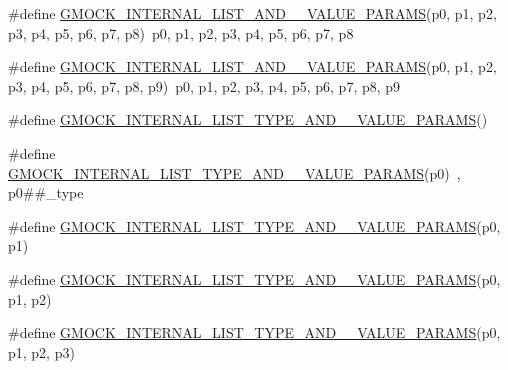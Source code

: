 \begin{DoxyCompactItemize}
\item 
\#define \mbox{\hyperlink{_obj__test_2lib_2googletest-master_2googlemock_2include_2gmock_2gmock-generated-actions_8h_a3e91ec053856b1b3c011b71810fb0992}{G\+M\+O\+C\+K\+\_\+\+I\+N\+T\+E\+R\+N\+A\+L\+\_\+\+L\+I\+S\+T\+\_\+\+A\+N\+D\+\_\+\_\+\+V\+A\+L\+U\+E\+\_\+\+P\+A\+R\+A\+MS}}(p0,  p1,  p2,  p3,  p4,  p5,  p6,  p7,  p8)~p0, p1, p2, p3, p4, p5, p6, p7, p8
\item 
\#define \mbox{\hyperlink{_obj__test_2lib_2googletest-master_2googlemock_2include_2gmock_2gmock-generated-actions_8h_a4dbbb45245e68e2f0eaf65d273c8822c}{G\+M\+O\+C\+K\+\_\+\+I\+N\+T\+E\+R\+N\+A\+L\+\_\+\+L\+I\+S\+T\+\_\+\+A\+N\+D\+\_\+\_\+\+V\+A\+L\+U\+E\+\_\+\+P\+A\+R\+A\+MS}}(p0,  p1,  p2,  p3,  p4,  p5,  p6,  p7,  p8,  p9)~p0, p1, p2, p3, p4, p5, p6, p7, p8, p9
\item 
\#define \mbox{\hyperlink{_obj__test_2lib_2googletest-master_2googlemock_2include_2gmock_2gmock-generated-actions_8h_a76ec2981c2b6c52e3c6cdd1eba7f37ac}{G\+M\+O\+C\+K\+\_\+\+I\+N\+T\+E\+R\+N\+A\+L\+\_\+\+L\+I\+S\+T\+\_\+\+T\+Y\+P\+E\+\_\+\+A\+N\+D\+\_\+\_\+\+V\+A\+L\+U\+E\+\_\+\+P\+A\+R\+A\+MS}}()
\item 
\#define \mbox{\hyperlink{_obj__test_2lib_2googletest-master_2googlemock_2include_2gmock_2gmock-generated-actions_8h_aa6b8f71158f750363cbf016eb92e0865}{G\+M\+O\+C\+K\+\_\+\+I\+N\+T\+E\+R\+N\+A\+L\+\_\+\+L\+I\+S\+T\+\_\+\+T\+Y\+P\+E\+\_\+\+A\+N\+D\+\_\+\_\+\+V\+A\+L\+U\+E\+\_\+\+P\+A\+R\+A\+MS}}(p0)~, p0\#\#\+\_\+type
\item 
\#define \mbox{\hyperlink{_obj__test_2lib_2googletest-master_2googlemock_2include_2gmock_2gmock-generated-actions_8h_a0cc50d9b0c031e712a38a3266b03af48}{G\+M\+O\+C\+K\+\_\+\+I\+N\+T\+E\+R\+N\+A\+L\+\_\+\+L\+I\+S\+T\+\_\+\+T\+Y\+P\+E\+\_\+\+A\+N\+D\+\_\+\_\+\+V\+A\+L\+U\+E\+\_\+\+P\+A\+R\+A\+MS}}(p0,  p1)
\item 
\#define \mbox{\hyperlink{_obj__test_2lib_2googletest-master_2googlemock_2include_2gmock_2gmock-generated-actions_8h_a5654c0d7f59fc85880c24738b6cb5976}{G\+M\+O\+C\+K\+\_\+\+I\+N\+T\+E\+R\+N\+A\+L\+\_\+\+L\+I\+S\+T\+\_\+\+T\+Y\+P\+E\+\_\+\+A\+N\+D\+\_\+\_\+\+V\+A\+L\+U\+E\+\_\+\+P\+A\+R\+A\+MS}}(p0,  p1,  p2)
\item 
\#define \mbox{\hyperlink{_obj__test_2lib_2googletest-master_2googlemock_2include_2gmock_2gmock-generated-actions_8h_ad00ece06c41ce47e499fef47d0ee9459}{G\+M\+O\+C\+K\+\_\+\+I\+N\+T\+E\+R\+N\+A\+L\+\_\+\+L\+I\+S\+T\+\_\+\+T\+Y\+P\+E\+\_\+\+A\+N\+D\+\_\+\_\+\+V\+A\+L\+U\+E\+\_\+\+P\+A\+R\+A\+MS}}(p0,  p1,  p2,  p3)

\end{DoxyCompactItemize}
